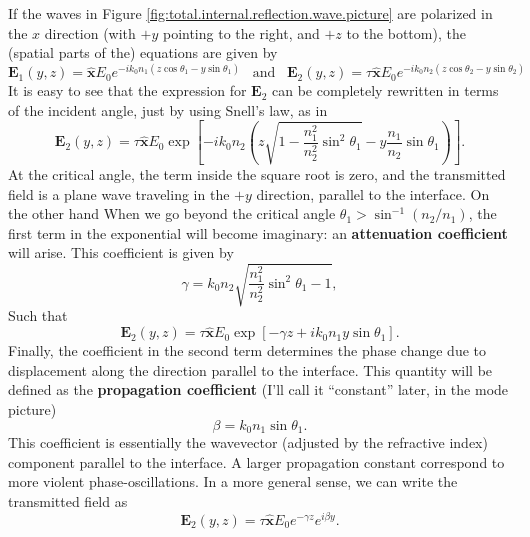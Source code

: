 If the waves in Figure \ref{fig:total.internal.reflection.wave.picture} are polarized in the $x$ direction (with $+y$ pointing to the right, and $+z$ to the bottom), the (spatial parts of the) equations are given by
\begin{equation}
    \textbf{E}_1(y,z)=\hat{\textbf{x}}E_0e^{-ik_0n_1\left(z\cos\theta_1-y\sin\theta_1\right)}\;\;\;\text{and}\;\;\;\textbf{E}_2(y,z)=\tau\hat{\textbf{x}}E_0e^{-ik_0n_2\left(z\cos\theta_2-y\sin\theta_2\right)}
\end{equation}
It is easy to see that the expression for $\textbf{E}_2$ can be completely rewritten in terms of the incident angle, just by using Snell's law, as in
\begin{equation}
    \textbf{E}_2(y,z)=\tau\hat{\textbf{x}}E_0\exp\left[-ik_0n_2\left(z\sqrt{1-\frac{n_1^2}{n_2^2}\sin^2\theta_1}-y\frac{n_1}{n_2}\sin\theta_1\right)\right].
\end{equation}
At the critical angle, the term inside the square root is zero, and the transmitted field is a plane wave traveling in the $+y$ direction, parallel to the interface. On the other hand When we go beyond the critical angle $\theta_1>\sin^{-1}(n_2/n_1)$, the first term in the exponential will become imaginary: an \textbf{attenuation coefficient} will arise. This coefficient is given by
\begin{equation}
    \gamma=k_0n_2\sqrt{\frac{n_1^2}{n_2^2}\sin^2\theta_1-1},
    \label{eq:attenuation.coefficient.chap.1}
\end{equation}
Such that
\begin{equation}
    \textbf{E}_2(y,z)=\tau\hat{\textbf{x}}E_0\exp\left[-\gamma z+ik_0n_1y\sin\theta_1\right].
\end{equation}
Finally, the coefficient in the second term determines the phase change due to displacement along the direction parallel to the interface. This quantity will be defined as the \textbf{propagation coefficient} (I'll call it ``constant'' later, in the mode picture)
\begin{equation}
    \beta=k_0n_1\sin\theta_1.
\end{equation}
This coefficient is essentially the wavevector (adjusted by the refractive index) component parallel to the interface. A larger propagation constant correspond to more violent phase-oscillations. In a more general sense, we can write the transmitted field as
\begin{equation}
    \textbf{E}_2(y,z)=\tau\hat{\textbf{x}}E_0e^{-\gamma z}e^{i\beta y}.
\end{equation}

